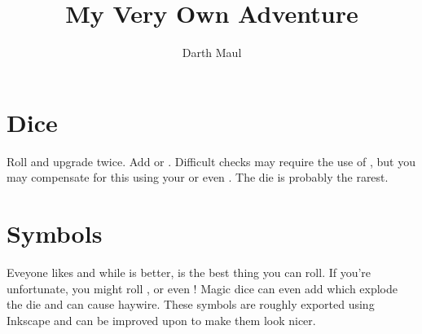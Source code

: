 \documentclass[a4paper]{article}
\title{My Very Own Adventure}
\author{Darth Maul}
\begin{document}
\maketitle

\section{Dice}

Roll \difficulty\difficulty and upgrade twice. Add \boost or \setback\setback.
Difficult checks may require the use of \challenge, but you may compensate for
this using your \ability\ability or even \proficiency. The \magic die is
probably the rarest.

\section{Symbols}

Eveyone likes \success and while \advantage is better, \triumph is the best
thing you can roll. If you're unfortunate, you might roll \failure, \threat or
even \despair! Magic dice can even add \overload which explode the die and can cause haywire. These symbols
are roughly exported using Inkscape and can be improved upon to make them look
nicer.
\end{document}
